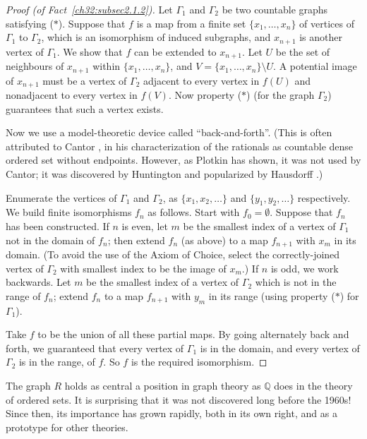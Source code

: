 \documentclass[12pt]{article}
\begin{document}
\begin{proof}[Proof (of Fact~\ref{ch32:subsec2.1.2})]
Let $\Gamma_1$ and
$\Gamma_2$ be two countable graphs satisfying ($\ast$). Suppose that
$f$ is a map from a finite set $\{x_1,\ldots, x_n\}$ of vertices of
$\Gamma_1$ to $\Gamma_2$, which is an isomorphism of induced
subgraphs, and $x_{n+1}$ is another vertex of $\Gamma_1$. We show
that $f$ can be extended to $x_{n+1}$. Let $U$ be the set of
neighbours of $x_{n+1}$ within $\{x_1,\ldots, x_n\}$, and $V =
\{x_1,\ldots, x_n\} \setminus U$. A potential image of $x_{n+1}$
must be a vertex of $\Gamma_2$ adjacent to every vertex in 
$f(U)$ and nonadjacent to every vertex in $f(V)$. Now property
($\ast$) (for the graph $\Gamma_2$) guarantees that such a vertex
exists.

Now we use a model-theoretic device called ``back-and-forth''. (This
is often attributed to Cantor \cite{ch32:bib11}, in his
characterization of the rationals as countable dense ordered set
without endpoints. However, as Plotkin \cite{ch32:bib41} has shown,
it was not used by Cantor; it was discovered by Huntington
\cite{ch32:bib32} and popularized by Hausdorff \cite{ch32:bib25}.)

Enumerate the vertices of $\Gamma_1$ and $\Gamma_2$, as $\{x_1,
x_2, \ldots\}$ and $\{y_1, y_2, \ldots\}$ respectively. We build
finite isomorphisms $f_n$ as follows. Start with $f_0 = \emptyset$.
Suppose that $f_n$ has been constructed. If $n$ is even, let $m$ be
the smallest index of a vertex of $\Gamma_1$ not in the domain of
$f_n$; then extend $f_n$ (as above) to a map $f_{n+1}$ with $x_m$ in
its domain. (To avoid the use of the Axiom of Choice, select the
correctly-joined vertex of $\Gamma_2$ with smallest index to be the
image of $x_m$.) If $n$ is odd, we work backwards. Let $m$ be the
smallest index of a vertex of $\Gamma_2$ which is not in the range
of $f_n$; extend $f_n$ to a map $f_{n+1}$ with $y_m$ in its range
(using property ($\ast$) for $\Gamma_1$).

Take $f$ to be the union of all these partial maps. By going
alternately back and forth, we guaranteed that every vertex of
$\Gamma_1$ is in the domain, and every vertex of $\Gamma_2$ is in
the range, of $f$. So $f$ is the required isomorphism.
\end{proof}

The graph $R$ holds as central a position in graph theory as
$\mathbb{Q}$ does in the theory of ordered sets. It is surprising
that it was not discovered long before the 1960s! Since then, its
importance has grown rapidly, both in its own right, and as a prototype
for other theories.
\end{document}
